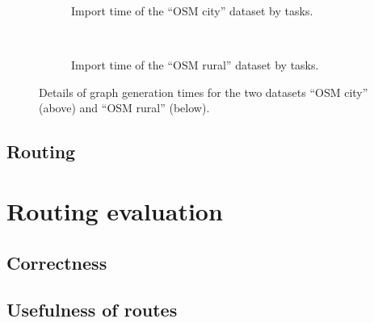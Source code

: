 		\begin{figure}[h]
			\begin{figcenter}
				\begin{subfigure}[t]{\textwidth}
					\begin{figcenter}
						
					\end{figcenter}
					\caption{Import time of the \enquote{OSM city} dataset by tasks.}
				\end{subfigure}
%						
			\end{figcenter}
			\\
			\begin{figcenter}
				\begin{subfigure}[t]{\textwidth}
					\begin{figcenter}
						
					\end{figcenter}
					\caption{Import time of the \enquote{OSM rural} dataset by tasks.}
				\end{subfigure}
%						
			\end{figcenter}
			\caption{Details of graph generation times for the two datasets \enquote{OSM city} (above) and \enquote{OSM rural} (below).}
			\label{fig:eval-import-details}
		\end{figure}
	
	\subsection{Routing}
	
\section{Routing evaluation}

	\subsection{Correctness}
	

	\subsection{Usefulness of routes}
	
